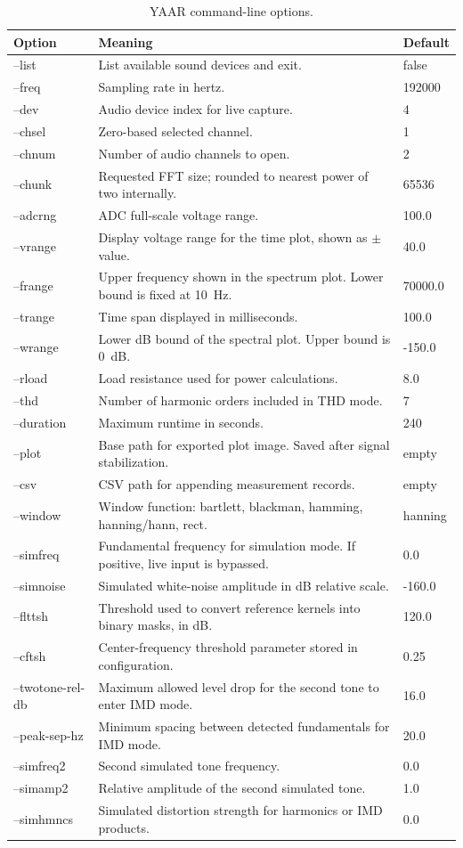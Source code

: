 \documentclass[conference]{IEEEtran}
\begin{document}
\begin{table}[t]
\centering
\caption{YAAR command-line options.}
\label{tab:cli}
\begin{tabular}{>{\ttfamily}p{2.7cm} p{8.8cm} p{2.0cm}}
\toprule
Option & Meaning & Default \\
\midrule
--list & List available sound devices and exit. & false \\
--freq & Sampling rate in hertz. & 192000 \\
--dev & Audio device index for live capture. & 4 \\
--chsel & Zero-based selected channel. & 1 \\
--chnum & Number of audio channels to open. & 2 \\
--chunk & Requested FFT size; rounded to nearest power of two internally. & 65536 \\
--adcrng & ADC full-scale voltage range. & 100.0 \\
--vrange & Display voltage range for the time plot, shown as $\pm$ value. & 40.0 \\
--frange & Upper frequency shown in the spectrum plot. Lower bound is fixed at \SI{10}{Hz}. & 70000.0 \\
--trange & Time span displayed in milliseconds. & 100.0 \\
--wrange & Lower dB bound of the spectral plot. Upper bound is \SI{0}{dB}. & -150.0 \\
--rload & Load resistance used for power calculations. & 8.0 \\
--thd & Number of harmonic orders included in THD mode. & 7 \\
--duration & Maximum runtime in seconds. & 240 \\
--plot & Base path for exported plot image. Saved after signal stabilization. & empty \\
--csv & CSV path for appending measurement records. & empty \\
--window & Window function: bartlett, blackman, hamming, hanning/hann, rect. & hanning \\
--simfreq & Fundamental frequency for simulation mode. If positive, live input is bypassed. & 0.0 \\
--simnoise & Simulated white-noise amplitude in dB relative scale. & -160.0 \\
--flttsh & Threshold used to convert reference kernels into binary masks, in dB. & 120.0 \\
--cftsh & Center-frequency threshold parameter stored in configuration. & 0.25 \\
--twotone-rel-db & Maximum allowed level drop for the second tone to enter IMD mode. & 16.0 \\
--peak-sep-hz & Minimum spacing between detected fundamentals for IMD mode. & 20.0 \\
--simfreq2 & Second simulated tone frequency. & 0.0 \\
--simamp2 & Relative amplitude of the second simulated tone. & 1.0 \\
--simhmncs & Simulated distortion strength for harmonics or IMD products. & 0.0 \\
\bottomrule
\end{tabular}
\end{table}
\end{document}
